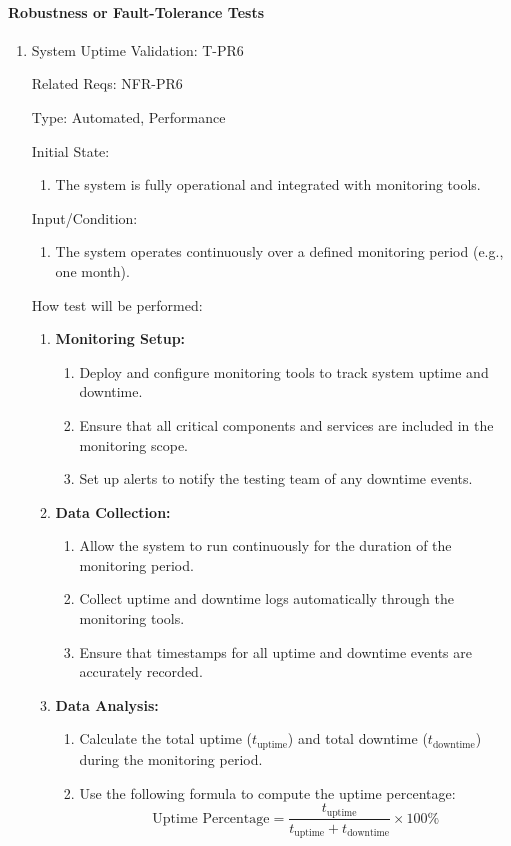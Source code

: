 \documentclass[12pt, titlepage]{article}
\begin{document}
\paragraph{Robustness or Fault-Tolerance Tests}
\begin{enumerate}

\item{System Uptime Validation: T-PR6\\}

Related Reqs: NFR-PR6

Type: Automated, Performance

Initial State:
\begin{enumerate}
    \item The system is fully operational and integrated with monitoring tools.
\end{enumerate}
Input/Condition:
\begin{enumerate}
    \item The system operates continuously over a defined monitoring period (e.g., one month).
\end{enumerate}
How test will be performed:
\begin{enumerate}
    \item \textbf{Monitoring Setup:}
    \begin{enumerate}
        \item Deploy and configure monitoring tools to track system uptime and downtime.
        \item Ensure that all critical components and services are included in the monitoring scope.
        \item Set up alerts to notify the testing team of any downtime events.
    \end{enumerate}
    
    \item \textbf{Data Collection:}
    \begin{enumerate}
        \item Allow the system to run continuously for the duration of the monitoring period.
        \item Collect uptime and downtime logs automatically through the monitoring tools.
        \item Ensure that timestamps for all uptime and downtime events are accurately recorded.
    \end{enumerate}
    
    \item \textbf{Data Analysis:}
    \begin{enumerate}
        \item Calculate the total uptime ($t_{\text{uptime}}$) and total downtime ($t_{\text{downtime}}$) during the monitoring period.
        \item Use the following formula to compute the uptime percentage:
        \[
        \text{Uptime Percentage} = \frac{t_{\text{uptime}}}{t_{\text{uptime}} + t_{\text{downtime}}} \times 100\%
        \]
    \end{enumerate}
    

\end{enumerate}
\end{enumerate}
\end{document}

